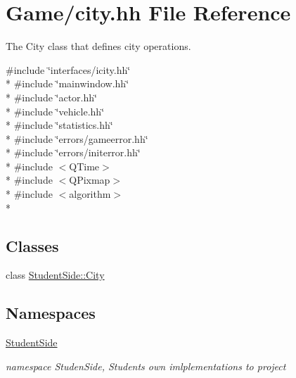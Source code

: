 \hypertarget{city_8hh}{\section{Game/city.hh File Reference}
\label{city_8hh}
}


The City class that defines city operations.  


{\ttfamily \#include \char`\"{}interfaces/icity.\-hh\char`\"{}}\\*
{\ttfamily \#include \char`\"{}mainwindow.\-hh\char`\"{}}\\*
{\ttfamily \#include \char`\"{}actor.\-hh\char`\"{}}\\*
{\ttfamily \#include \char`\"{}vehicle.\-hh\char`\"{}}\\*
{\ttfamily \#include \char`\"{}statistics.\-hh\char`\"{}}\\*
{\ttfamily \#include \char`\"{}errors/gameerror.\-hh\char`\"{}}\\*
{\ttfamily \#include \char`\"{}errors/initerror.\-hh\char`\"{}}\\*
{\ttfamily \#include $<$Q\-Time$>$}\\*
{\ttfamily \#include $<$Q\-Pixmap$>$}\\*
{\ttfamily \#include $<$algorithm$>$}\\*
\subsection*{Classes}
\begin{DoxyCompactItemize}
\item 
class \hyperlink{class_student_side_1_1_city}{Student\-Side\-::\-City}
\end{DoxyCompactItemize}
\subsection*{Namespaces}
\begin{DoxyCompactItemize}
\item 
\hyperlink{namespace_student_side}{Student\-Side}
\begin{DoxyCompactList}\small\item\em namespace Studen\-Side, Students own imlplementations to project \end{DoxyCompactList}\end{DoxyCompactItemize}
